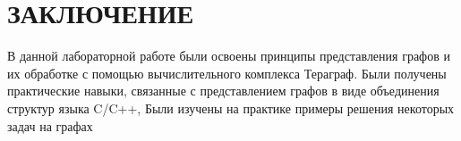 \section*{ЗАКЛЮЧЕНИЕ}

В данной лабораторной работе были освоены принципы представления графов и их обработке с помощью вычислительного комплекса Тераграф.
Были получены практические навыки, связанные с представлением графов в виде объединения структур языка C/C++,
Были изучены на практике примеры решения некоторых задач на графах
